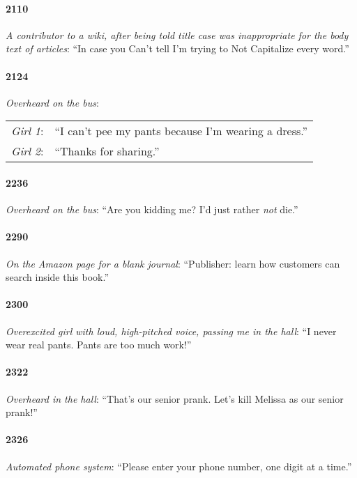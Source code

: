 \documentclass[10pt]{memoir}
\newcommand{\speakertag}[1]{\emph{#1}: }
\newcommand{\st}{\speakertag}
\newcommand{\intro}[1]{\emph{#1}}
\begin{document}
\paragraph{2110} \intro{A contributor to a wiki, after being told title case was inappropriate for the body text of articles}: ``In case you Can't tell I'm trying to Not Capitalize every word.''

\paragraph{2124} \intro{Overheard on the bus}: \\

\noindent \begin{tabularx}{\textwidth}{r X}
  \st{Girl 1} & ``I can't pee my pants because I'm wearing a dress.'' \\
  \st{Girl 2} & ``Thanks for sharing.''
\end{tabularx}

\paragraph{2236} \intro{Overheard on the bus}: ``Are you kidding me? I'd just rather \emph{not} die.''

\paragraph{2290} \intro{On the Amazon page for a blank journal}: ``Publisher: learn how customers can search inside this book.''

\paragraph{2300} \intro{Overexcited girl with loud, high-pitched voice, passing me in the hall}: ``I never wear real pants. Pants are too much work!''

\paragraph{2322} \intro{Overheard in the hall}: ``That's our senior prank. Let's kill Melissa as our senior prank!''

\paragraph{2326} \intro{Automated phone system}: ``Please enter your phone number, one digit at a time.''
\end{document}
